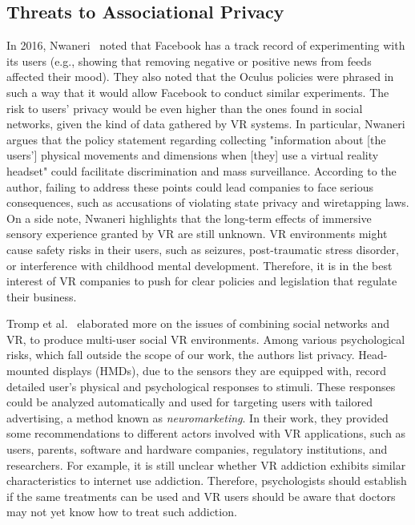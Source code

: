 \documentclass[journal]{IEEEtran}
\begin{document}
\subsection{Threats to Associational Privacy}
In 2016, Nwaneri~\cite{nwaneri2016} noted that Facebook has a track record of experimenting with its users (e.g., showing that removing negative or positive news from feeds affected their mood). They also noted that the Oculus policies were phrased in such a way that it would allow Facebook to conduct similar experiments. The risk to users' privacy would be even higher than the ones found in social networks, given the kind of data gathered by VR systems. In particular, Nwaneri argues that the policy statement regarding collecting "information about [the users'] physical movements and dimensions when [they] use a virtual reality headset" could facilitate discrimination and mass surveillance. According to the author, failing to address these points could lead companies to face serious consequences, such as accusations of violating state privacy and wiretapping laws. On a side note, Nwaneri highlights that the long-term effects of immersive sensory experience granted by VR are still unknown. VR environments might cause safety risks in their users, such as seizures, post-traumatic stress disorder, or interference with childhood mental development. Therefore, it is in the best interest of VR companies to push for clear policies and legislation that regulate their business.

Tromp et al.~\cite{tromp2018} elaborated more on the issues of combining social networks and VR, to produce multi-user social VR environments. Among various psychological risks, which fall outside the scope of our work, the authors list privacy. Head-mounted displays (HMDs), due to the sensors they are equipped with, record detailed user's physical and psychological responses to stimuli. These responses could be analyzed automatically and used for targeting users with tailored advertising, a method known as \textit{neuromarketing}. In their work, they provided some recommendations to different actors involved with VR applications, such as users, parents, software and hardware companies, regulatory institutions, and researchers. For example, it is still unclear whether VR addiction exhibits similar characteristics to internet use addiction. Therefore, psychologists should establish if the same treatments can be used and VR users should be aware that doctors may not yet know how to treat such addiction.
\end{document}
